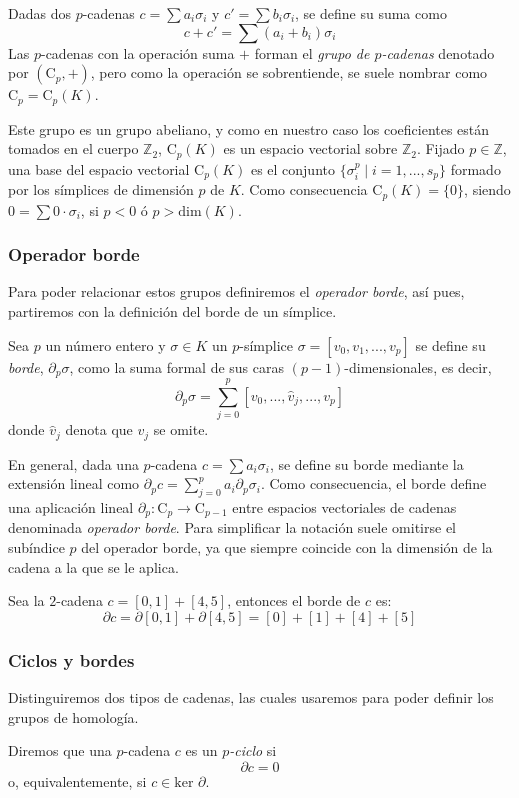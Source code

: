 Dadas dos $p$-cadenas $c = \sum a_i\sigma_i$ y $c' = \sum b_i\sigma_i$, se define su suma como
\[
c + c' = \sum (a_i + b_i)\sigma_i
\]
Las $p$-cadenas con la operación suma $+$ forman el \emph{grupo de $p$-cadenas} denotado por $(\text{C}_p,+)$, pero como la operación se sobrentiende, se suele nombrar como $\text{C}_p=\text{C}_p(K)$.

Este grupo es un grupo abeliano, y como en nuestro caso los coeficientes están tomados en el cuerpo $\mathbb{Z}_2$, $\text{C}_p(K)$ es un espacio vectorial sobre $\mathbb{Z}_2$. Fijado $p \in \mathbb{Z}$, una base del espacio vectorial $\text{C}_p(K)$ es el conjunto $\{\sigma_i^p \mid i=1,...,s_p\}$ formado por los símplices de dimensión $p$ de $K$. Como consecuencia $\text{C}_p(K)=\{0\}$, siendo $0 = \sum 0\cdot\sigma_i$, si $p < 0$ ó $p > \text{dim}(K)$.

\subsubsection*{Operador borde}
Para poder relacionar estos grupos definiremos el \emph{operador borde}, así pues, partiremos con la definición del borde de un símplice.

\begin{definition}
Sea $p$ un número entero y $\sigma \in K$ un $p$-símplice $\sigma = [v_0, v_1, ..., v_p]$ se define su \emph{borde}, $\partial_p\sigma$, como la suma formal de sus caras $(p-1)$-dimensionales, es decir, 
\[
\partial_p\sigma = \sum_{j=0}^{p}[v_0, ..., \hat{v}_j, ..., v_p]
\]
donde $\hat{v}_j$ denota que $v_j$ se omite.
\end{definition}

En general, dada una $p$-cadena $c =\sum a_i\sigma_i$, se define su borde mediante la extensión lineal como  $\partial_p c= \sum_{j=0}^{p} a_i \partial_p \sigma_i$. Como consecuencia, el borde define una aplicación lineal $\partial_p: \text{C}_p \to \text{C}_{p-1}$ entre espacios vectoriales de cadenas denominada \emph{operador borde}. Para simplificar la notación suele omitirse el subíndice $p$ del operador borde, ya que siempre coincide con la dimensión de la cadena a la que se le aplica.

\begin{exmp}
Sea la $2$-cadena $c = [0,1] + [4,5]$, entonces el borde de $c$ es:
\[
\partial c = \partial [0,1] + \partial [4,5] = [0] + [1] + [4] + [5]
\]
\end{exmp}

\subsubsection*{Ciclos y bordes}
Distinguiremos dos tipos de cadenas, las cuales usaremos para poder definir los grupos de homología. 
\begin{definition}
Diremos que una $p$-cadena $c$ es un \emph{$p$-ciclo} si
\[
\partial c = 0
\]
o, equivalentemente, si $c \in \text{ker }\partial$.
\end{definition}

